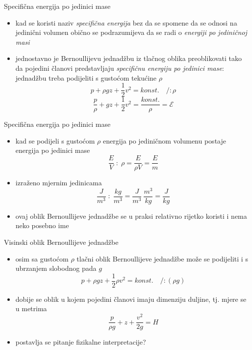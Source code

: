 \documentclass[croatian]{beamer}
\begin{document}
\begin{frame}{Specifična energija po jedinici mase}

\begin{itemize}
\item kad se koristi naziv \emph{specifična energija} bez da se spomene
da se odnosi na jedinični volumen obično se podrazumijeva da se radi
o \emph{energiji po jediničnoj masi}
\item jednostavno je Bernoullijevu jednadžbu iz tlačnog oblika preoblikovati
tako da pojedini članovi predstavljaju \emph{specifičnu energiju po
jedinici mase}: jednadžbu treba podijeliti s gustoćom tekućine $\rho$
\[
p+\rho gz+\frac{1}{2}v^{2}=konst.\quad/:\rho
\]
\[
\frac{p}{\rho}+gz+\frac{1}{2}v^{2}=\frac{konst.}{\rho}=\mathcal{E}
\]
\end{itemize}
\end{frame}

\begin{frame}{Specifična energija po jedinici mase}

\begin{itemize}
\item kad se podijeli s gustoćom $\rho$ energija po jediničnom volumenu
postaje energija po jedinici mase
\[
\frac{E}{V}\;:\;\rho=\frac{E}{\rho V}=\frac{E}{m}
\]
\item izraženo mjernim jedinicama
\[
\frac{J}{m^{3}}\;:\;\frac{kg}{m^{3}}=\frac{J}{m^{3}}\:\frac{m^{3}}{kg}=\frac{J}{kg}
\]
\item ovaj oblik Bernoullijeve jednadžbe se u praksi relativno rijetko koristi
i nema neko posebno ime
\end{itemize}
\end{frame}

\begin{frame}{Visinski oblik Bernoullijeve jednadžbe}

\begin{itemize}
\item osim sa gustoćom $\rho$ tlačni oblik Bernoullijeve jednadžbe može
se podijeliti i s ubrzanjem slobodnog pada $g$ 
\[
p+\rho gz+\frac{1}{2}\rho v^{2}=konst.\quad/:(\rho g)
\]
\item dobije se oblik u kojem pojedini članovi imaju dimenziju duljine,
tj. mjere se u metrima
\[
\frac{p}{\rho g}+z+\frac{v^{2}}{2g}=H
\]
\item postavlja se pitanje fizikalne interpretacije?
\end{itemize}
\end{frame}
\end{document}
